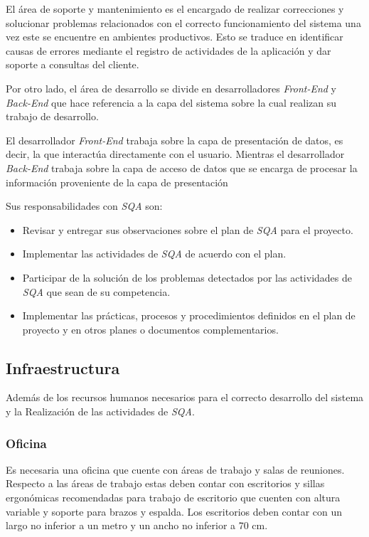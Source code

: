 El área de soporte y mantenimiento es el encargado de realizar correcciones y solucionar problemas relacionados con el correcto funcionamiento del sistema una vez este se encuentre en ambientes productivos. Esto se traduce en identificar causas de errores mediante el registro de actividades de la aplicación y dar soporte a consultas del cliente.

Por otro lado, el área de desarrollo se divide en desarrolladores \emph{Front-End} y \emph{Back-End} que hace referencia a la capa del sistema sobre la cual realizan su trabajo de desarrollo. 

El desarrollador \emph{Front-End} trabaja sobre la capa de presentación de datos, es decir, la que interactúa directamente con el usuario. Mientras el desarrollador \emph{Back-End} trabaja sobre la capa de acceso de datos que se encarga de procesar la información proveniente de la capa de presentación

Sus responsabilidades con \emph{SQA} son: 

	\begin{itemize}
		\item
		Revisar y entregar sus observaciones sobre el plan de \emph{SQA} para el proyecto.
		\item
		Implementar las actividades de \emph{SQA} de acuerdo con el plan.
		\item
		Participar de la solución de los problemas detectados por las actividades de \emph{SQA} que sean de su competencia.
		\item
		Implementar las prácticas, procesos y procedimientos definidos en el plan de proyecto y en otros planes o documentos complementarios.
	\end{itemize}

\subsection{Infraestructura}

Además de los recursos humanos necesarios para el correcto desarrollo del sistema y la Realización de las actividades de \emph{SQA}.

\subsubsection{Oficina}

Es necesaria una oficina que cuente con áreas de trabajo y salas de reuniones. Respecto a las áreas de trabajo estas deben contar con escritorios y sillas ergonómicas recomendadas para trabajo de escritorio que cuenten con altura variable y soporte para brazos y espalda. Los escritorios deben contar con un largo no inferior a un metro y un ancho no inferior a 70 cm. 

